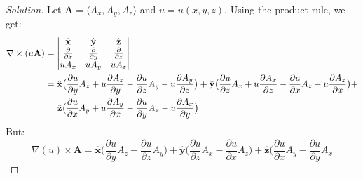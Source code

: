 \documentclass[crop=false,class=article,oneside]{standalone}
\begin{document}
        \begin{proof}[Solution]
            Let $\mathbf{A}=\langle{A_{x},A_{y},A_{z}}\rangle$
            and $u=u(x,y,z)$.
            Using the product rule, we get:
            \begin{align*}
                \nabla\times (u\mathbf{A})
                &=
                \begin{vmatrix}
                    \hat{\mathbf{x}}
                    &\hat{\mathbf{y}}
                    &\hat{\mathbf{z}}\\
                    \frac{\partial}{\partial{x}}
                    &\frac{\partial}{\partial{y}}
                    &\frac{\partial}{\partial{z}}\\
                    uA_{x}
                    &uA_{y}
                    &uA_{z}
                \end{vmatrix}\\
                &=\hat{\mathbf{x}}\big(
                    \frac{\partial{u}}{\partial{y}}A_{z}
                    +u\frac{\partial{A_{z}}}{\partial{y}}
                    -\frac{\partial{u}}{\partial{z}}A_{y}
                    -u\frac{\partial{A_{y}}}{\partial{z}}
                \big)+\hat{\mathbf{y}}\big(
                    \frac{\partial{u}}{\partial{z}}A_{x}
                    +u\frac{\partial{A_{x}}}{\partial{z}}
                    -\frac{\partial{u}}{\partial{x}}A_{z}
                    -u\frac{\partial{A_{z}}}{\partial{x}}
                \big)+\\
                &\hspace{1.4em}
                \hat{\mathbf{z}}\big(
                    \frac{\partial{u}}{\partial{x}}A_{y}+
                    u\frac{\partial{A_{y}}}{\partial{x}}
                    -\frac{\partial{u}}{\partial{y}}A_{x}
                    -u\frac{\partial{A_{x}}}{\partial{y}}
                \big)
            \end{align*}
            But:
            \begin{equation*}
                \nabla(u)\times\mathbf{A}
                =\hat{\mathbf{x}}\big(
                    \frac{\partial u}{\partial y}
                    A_{z}-\frac{\partial u}{\partial z}A_{y}
                \big)
                +\hat{\mathbf{y}}\big(
                    \frac{\partial u}{\partial z}A_{x}
                    -\frac{\partial u}{\partial x}A_{z}
                \big)
                +\hat{\mathbf{z}}\big(
                    \frac{\partial u}{\partial x}A_{y}
                    -\frac{\partial u}{\partial y}A_{x}

\end{equation*}
\end{proof}
\end{document}
